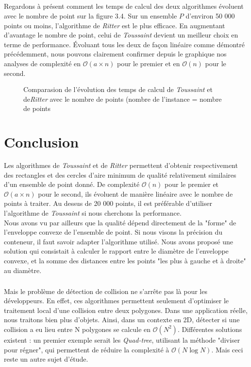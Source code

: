 \documentclass[a4paper, 12pt]{report}
\newcommand{\bigO}{\mathcal{O}}
\begin{document}
\paragraph{}
Regardons à présent comment les temps de calcul des deux algorithmes évoluent avec le nombre de point sur la figure 3.4. Sur un ensemble $P$ d'environ 50 000 points ou moins, l'algorithme de \emph{Ritter} est le plus efficace. En augmentant d'avantage le nombre de point, celui de \emph{Toussaint} devient un meilleur choix en terme de performance. Évoluant tous les deux de façon linéaire comme démontré précédemment, nous pouvons clairement confirmer depuis le graphique nos analyses de complexité en  $\bigO(a \times n)$ pour le premier et en  $\bigO(n)$ pour le second. 
\begin{figure}[htbp]
\centering
\begin{minipage}[t]{0.47
\textwidth}
\def\svgscale{0.45}

\caption{Comparasion de l'évolution des temps de calcul de \emph{Toussaint} et de\emph{Ritter} avec le nombre de points (nombre de l'instance = nombre de points}
\end{minipage}
\end{figure}

\chapter{Conclusion}

Les algorithmes de \emph{Toussaint} et de \emph{Ritter} permettent d'obtenir respectivement des rectangles et des cercles d'aire minimum de qualité relativement similaires d'un ensemble de point donné. De complexité $\bigO(n)$ pour le premier et $\bigO(a \times n)$ pour le second, ils évoluent de manière linéaire avec le nombre de points à traiter. Au dessus de 20 000 points,  il est préférable d'utiliser l'algorithme de \emph{Toussaint} si nous cherchons la performance. \\
Nous avons vu par ailleurs que la qualité dépend directement de la "forme" de l'enveloppe convexe de l'ensemble de point. Si nous visons la précision du conteneur, il faut savoir adapter l'algorithme utilisé. Nous avons proposé une solution qui consistait à calculer le rapport entre le diamètre de l'enveloppe convexe, et la somme des distances entre les points "les plus à gauche et à droite" au diamètre. 
\paragraph{}
Mais le problème de détection de collision ne s'arrête pas là pour les développeurs. En effet, ces algorithmes permettent seulement d'optimiser le traitement local d'une collision entre deux polygones. Dans une application réelle, nous traitons bien plus d'objets. Ainsi, dans un contexte en 2D, détecter si une collision a eu lieu entre N polygones se calcule en $\bigO(N^2)$. Différentes solutions existent : un premier exemple serait les \emph{Quad-tree}, utilisant la méthode "diviser pour régner", qui permettent de réduire la complexité à $\bigO(N \log N)$. Mais ceci reste un autre sujet d'étude.
\newpage


\end{document}
